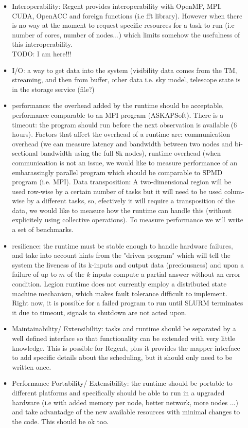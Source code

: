 \begin{itemize}
\item Interoperability: Regent provides interoperability with OpenMP,  MPI, CUDA, OpenACC and foreign functions  (i.e fft library). However when there is no way at the moment to request specific resources for a task to run (i.e number of cores, number of nodes...) which limits somehow the usefulness of 
this interoperability.
\\ TODO: I am here!!!
\item I/O: a way to get data into the system (visibility data comes from the TM, streaming, and then from buffer, other data i.e. sky model, telescope state is in the storage service (file?)
\item performance: the overhead added by the runtime should be acceptable, performance comparable to an MPI program (ASKAPSoft). There is a timeout: the program should run before the next observation is available (6 hours). Factors that affect the overhead of a runtime are: communication overhead (we can measure latency and bandwidth between two nodes and bi-sectional bandwidth using the full 8k nodes), runtime overhead (when communication is not an issue, we would like to measure performance of an embarassingly parallel program which should be comparable to SPMD program (i.e. MPI). Data transposition: A two-dimensional region will be used row-wise by a certain number of tasks but it will need to be used colum-wise by a different tasks, so, efectively it will require a transposition of the data, we would like to measure how the runtime can handle this (without explicitely using collective operations). To measure performance we will write a set of benchmarks.  
\item resilience: the runtime must be stable enough to handle hardware failures, and take into account hints from the "driven program" which will tell the system the liveness of its k-inputs and output data (preciousness) and upon a failure of up to $m$ of the $k$ inputs compute a partial answer without an error condition. Legion runtime does not currently employ a distributed state machine mechanism, which makes fault tolerance difficult to implement. Right now, it is possible for a failed program to run until SLURM terminates it due to timeout, signals to shutdown are not acted upon.  
\item Maintainability/ Extensibility: tasks and runtime should be separated by a well defined interface so that functionality can be extended with very little knowledge. This is possible for Regent, plus it provides the mapper interface to add specific details about the scheduling, but it should only need to be written once.
\item Performance Portability/ Extensibility: the runtime should be portable to different platforms and specifically should be able to run in a upgraded hardware (i.e with added memory per node, better network, more nodes ...) and take advantadge of the new available resources with minimal changes to the code. This should be ok too.
\end{itemize}
